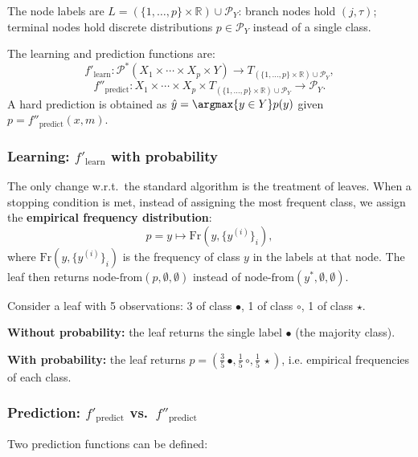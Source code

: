 \begin{definitionblock}
The node labels are $L = (\{1,\ldots,p\} \times \mathbb{R}) \cup \mathcal{P}_Y$: branch nodes hold $(j, \tau)$; terminal nodes hold discrete distributions $p \in \mathcal{P}_Y$ instead of a single class.

The learning and prediction functions are:
$$
f'_{\text{learn}} : \mathcal{P}^*(X_1 \times \cdots \times X_p \times Y) \to T_{(\{1,\ldots,p\} \times \mathbb{R}) \cup \mathcal{P}_Y},
$$
$$
f''_{\text{predict}} : X_1 \times \cdots \times X_p \times T_{(\{1,\ldots,p\} \times \mathbb{R}) \cup \mathcal{P}_Y} \to \mathcal{P}_Y.
$$
A hard prediction is obtained as $\hat{y} = \argmax{y \in Y} p(y)$ given $p = f''_{\text{predict}}(x, m)$.
\end{definitionblock}

\subsubsection{Learning: $f'_{\text{learn}}$ with probability}

The only change w.r.t.\ the standard algorithm is the treatment of leaves. When a stopping condition is met, instead of assigning the most frequent class, we assign the \textbf{empirical frequency distribution}:
$$
p = y \mapsto \mathrm{Fr}(y, \{y^{(i)}\}_i),
$$
where $\mathrm{Fr}(y, \{y^{(i)}\}_i)$ is the frequency of class $y$ in the labels at that node. The leaf then returns $\text{node-from}(p, \emptyset, \emptyset)$ instead of $\text{node-from}(y^*, \emptyset, \emptyset)$.

\begin{exampleblock}
Consider a leaf with 5 observations: 3 of class $\bullet$, 1 of class $\circ$, 1 of class $\star$.

\textbf{Without probability:} the leaf returns the single label $\bullet$ (the majority class).

\textbf{With probability:} the leaf returns $p = (\frac{3}{5}\,\bullet, \frac{1}{5}\,\circ, \frac{1}{5}\,\star)$, i.e. empirical frequencies of each class.
\end{exampleblock}

\subsubsection{Prediction: $f'_{\text{predict}}$ vs.\ $f''_{\text{predict}}$}

Two prediction functions can be defined:

